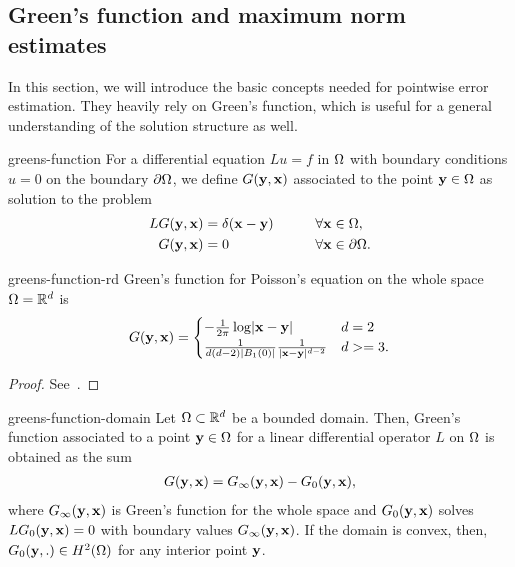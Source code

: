 \subsection{Green's function and maximum norm estimates}

\begin{intro}
  In this section, we will introduce the basic concepts needed for
  pointwise error estimation. They heavily rely on Green's function,
  which is useful for a general understanding of the solution
  structure as well.
\end{intro}

\begin{Definition}{greens-function}
  For a differential equation $Lu = f$ in $\Omega$ with boundary
  conditions $u=0$ on the boundary $\partial\Omega$, we define
   $G(\mathbf y,\mathbf x)$ associated to the point
  $\mathbf y\in\Omega$ as solution to the problem
  \begin{gather}
    \begin{aligned}
      L G(\mathbf y,\mathbf x) &= \delta(\mathbf x-\mathbf y)&\qquad\forall \mathbf x&\in\Omega,\\
      G(\mathbf y,\mathbf x) &= 0&\qquad\forall \mathbf x&\in\partial\Omega.
    \end{aligned}
  \end{gather}
\end{Definition}

\begin{Theorem}{greens-function-rd}
  Green's function for Poisson's equation on the whole space
  $\Omega=\mathbb R^d$ is
  \begin{gather}
    G(\mathbf y,\mathbf x) =
    \begin{cases}
      - \frac1{2\pi} \log \lvert\mathbf x-\mathbf y\rvert & d=2\\
      \frac1{d(d-2)\lvert B_1(0)\rvert} \frac1{\lvert\mathbf x-\mathbf y\rvert^{d-2}} & d>=3.
    \end{cases}
  \end{gather}
\end{Theorem}

\begin{proof}
  See~\cite[Section 2.2]{Evans98}.
\end{proof}

\begin{Lemma}{greens-function-domain}
  Let $\Omega\subset \mathbb R^d$ be a bounded domain. Then, Green's
  function associated to a point $\mathbf y\in\Omega$ for a linear
  differential operator $L$ on $\Omega$ is obtained as the sum
  \begin{gather}
    G(\mathbf y,\mathbf x) = G_\infty(\mathbf y,\mathbf x) - G_0(\mathbf y,\mathbf x),
  \end{gather}
  where $G_\infty(\mathbf y,\mathbf x)$ is Green's function for the whole space
  and $G_0(\mathbf y,\mathbf x)$ solves $LG_0(\mathbf y,\mathbf x)=0$ with boundary values
  $G_\infty(\mathbf y,\mathbf x)$. If the domain is convex, then,
  $G_0(\mathbf y,.)\in H^2(\Omega)$ for any interior point $\mathbf y$.
\end{Lemma}

